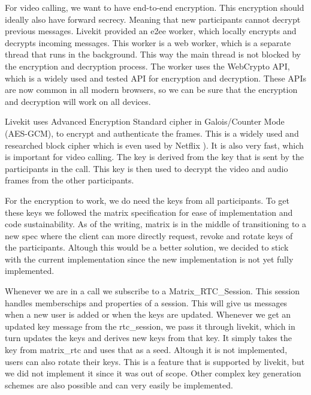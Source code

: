 \documentclass{report}
\begin{document}
    For video calling, we want to have end-to-end encryption. This encryption should ideally also have forward secrecy.
    Meaning that new participants cannot decrypt previous messages. Livekit provided an e2ee worker, which locally
    encrypts and decrypts incoming messages. This worker is a web worker, which is a separate thread that runs in the
    background. This way the main thread is not blocked by the encryption and decryption process. The worker uses the
    WebCrypto API, which is a widely used and tested API for encryption and decryption. These APIs are now common in all
    modern browsers, so we can be sure that the encryption and decryption will work on all devices.

    Livekit uses Advanced Encryption Standard cipher in Galois/Counter Mode (AES-GCM), to encrypt and authenticate the
    frames. This is a widely used and researched block cipher which is even used by Netflix ).
    It is also very fast, which is important for video calling. The key is derived from the key that is sent by the
    participants in the call. This key is then used to decrypt the video and audio frames from the other participants.


    For the encryption to work, we do need the keys from all participants. To get these keys we followed the matrix
    specification for ease of implementation and code sustainability. As of the writing, matrix is in the middle of transitioning to a
    new spec where the client can more directly request, revoke and rotate keys of the participants. Altough this would
    be a better solution, we decided to stick with the current implementation since the new implementation is not yet
    fully implemented.

    Whenever we are in a call we subscribe to a Matrix\_RTC\_Session. This session handles memberschips and
    properties of a session. This will give us messages when a new user is added or when the keys are updated.
    Whenever we get an updated key message from the rtc\_session, we pass it through livekit, which in turn updates
    the keys and derives new keys from that key. It simply takes the key from matrix\_rtc and uses
    that as a seed. Altough it is not implemented, users can also rotate their keys. This is a feature that is
    supported by livekit, but we did not implement it since it was out of scope. Other complex key generation schemes
    are also possible and can very easily be implemented.
\end{document}
